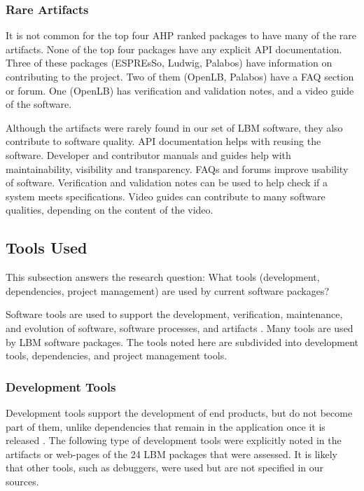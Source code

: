 \documentclass[final, 3p, times, authoryear]{elsarticle}
\begin{document}
\subsubsection{Rare Artifacts}

It is not common for the top four AHP ranked packages to have many of the rare
artifacts. None of the top four packages have any explicit API documentation.
Three of these packages (ESPREsSo, Ludwig, Palabos) have information on
contributing to the project. Two of them (OpenLB, Palabos) have a FAQ section or
forum. One (OpenLB) has verification and validation notes, and a video guide of
the software. 

Although the artifacts were rarely found in our set of LBM software, they also
contribute to software quality. API documentation helps with reusing the
software. Developer and contributor manuals and guides help with
maintainability, visibility and transparency. FAQs and forums improve usability
of software. Verification and validation notes can be used to help check if a
system meets specifications. Video guides can contribute to many software
qualities, depending on the content of the video. 

\subsection{Tools Used} \label{tools}

This subsection answers the research question: What tools (development,
dependencies, project management) are used by current software packages?

Software tools are used to support the development, verification, maintenance,
and evolution of software, software processes, and artifacts
\citep{ghezzi1991fundamentals}. Many tools are used by LBM software packages.
The tools noted here are subdivided into development tools, dependencies, and
project management tools.

\subsubsection{Development Tools}

Development tools support the development of end products, but do not become
part of them, unlike dependencies that remain in the application once it is
released \citep{ghezzi1991fundamentals}. The following type of development tools
were explicitly noted in the artifacts or web-pages of the 24 LBM packages that
were assessed. It is likely that other tools, such as debuggers, were used but
are not specified in our sources.
\end{document}
